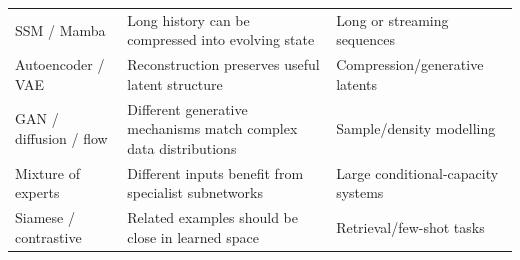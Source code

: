 \begin{longtable}{@{}L{.22\linewidth}L{.44\linewidth}L{.25\linewidth}@{}}
SSM / Mamba & Long history can be compressed into evolving state & Long or streaming sequences \\
Autoencoder / VAE & Reconstruction preserves useful latent structure & Compression/generative latents \\
GAN / diffusion / flow & Different generative mechanisms match complex data distributions & Sample/density modelling \\
Mixture of experts & Different inputs benefit from specialist subnetworks & Large conditional-capacity systems \\
Siamese / contrastive & Related examples should be close in learned space & Retrieval/few-shot tasks \\
\bottomrule
\end{longtable}
\normalsize
